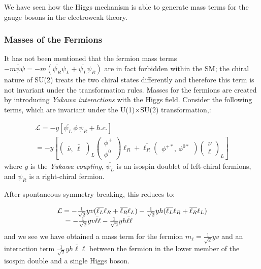 We have seen how the Higgs mechanism is able to generate mass terms for the gauge bosons in the electroweak theory.

\subsubsection{Masses of the Fermions}

It has not been mentioned that the fermion mass terms $-m\bar{\psi}\psi = -m( \overline{\psi_{R}} \psi_{L} + \overline{\psi_{L}}\psi_{R})$ are in fact forbidden within the SM; the chiral nature of SU(2) treats the two chiral states differently and therefore this term is not invariant under the transformation rules. Masses for the fermions are created by introducing \textit{Yukawa interactions} with the Higgs field. Consider the following terms, which are invariant under the U(1)$\times$SU(2) transformation,:

\begin{equation}
\begin{array}{l}
\mathcal{L} = -y [ \overline{\psi_{L}} \, \phi \, \psi_{R} + h.c.]\\
=  -y\left[\begin{pmatrix} \bar{\nu},\,\bar{\ell}\end{pmatrix}_{L} \begin{pmatrix} \phi^{+} \\ \phi^{0} \end{pmatrix} \ell_{R} + 
\overline{\ell_{R}} \begin{pmatrix} \phi^{+*},\,\phi^{0*} \end{pmatrix} \begin{pmatrix} \nu \\ \ell \end{pmatrix}_{L}\right]
\end{array}
\end{equation}
where $y$ is the \textit{Yukawa coupling}, $\overline{\psi_{L}}$ is an isospin doublet of left-chiral fermions, and $\psi_{R}$ is a right-chiral fermion.

After spontaneous symmetry breaking, this reduces to:

\begin{equation}
\begin{array}{l}
\mathcal{L} =
-\frac{1}{\sqrt{2}}yv (\overline{\ell_{L}}\ell_{R} + \overline{\ell_{R}}\ell_{L})
-\frac{1}{\sqrt{2}}yh (\overline{\ell_{L}}\ell_{R} + \overline{\ell_{R}}\ell_{L})\\
\hspace{4mm} = - \frac{1}{\sqrt{2}} yv \bar{\ell}\ell - \frac{1}{\sqrt{2}} y h \bar{\ell}\ell
\end{array}
\end{equation}
and we see we have obtained a mass term for the fermion $m_{\ell} = \frac{1}{\sqrt{2}} yv$ and an interaction term $\frac{1}{\sqrt{2}} y h \bar{\ell}\ell$ between the fermion in the lower member of the isospin double and a single Higgs boson.

